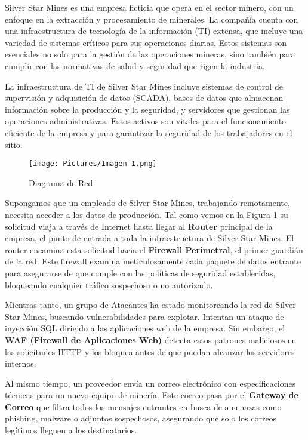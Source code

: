 

Silver Star Mines es una empresa ficticia que opera en el sector minero, con un enfoque en la extracción y procesamiento de minerales. La compañía cuenta con una infraestructura de tecnología de la información (TI) extensa, que incluye una variedad de sistemas críticos para sus operaciones diarias. Estos sistemas son esenciales no solo para la gestión de las operaciones mineras, sino también para cumplir con las normativas de salud y seguridad que rigen la industria.

La infraestructura de TI de Silver Star Mines incluye sistemas de control de supervisión y adquisición de datos (SCADA), bases de datos que almacenan información sobre la producción y la seguridad, y servidores que gestionan las operaciones administrativas. Estos activos son vitales para el funcionamiento eficiente de la empresa y para garantizar la seguridad de los trabajadores en el sitio.

\begin{figure}[h!]
    \centering
    \texttt{[image: Pictures/Imagen 1.png]}
    \caption{Diagrama de Red}
    \label{fig:diagramasilverstarmines}
\end{figure}

Supongamos que un empleado de Silver Star Mines, trabajando remotamente, necesita acceder a los datos de producción. Tal como vemos en la Figura \ref{fig:diagramasilverstarmines} su solicitud viaja a través de Internet hasta llegar al \textbf{Router} principal de la empresa, el punto de entrada a toda la infraestructura de Silver Star Mines.
El router encamina esta solicitud hacia el \textbf{Firewall Perimetral}, el primer guardián de la red. Este firewall examina meticulosamente cada paquete de datos entrante para asegurarse de que cumple con las políticas de seguridad establecidas, bloqueando cualquier tráfico sospechoso o no autorizado.


Mientras tanto, un grupo de Atacantes ha estado monitoreando la red de Silver Star Mines, buscando vulnerabilidades para explotar. Intentan un ataque de inyección SQL dirigido a las aplicaciones web de la empresa. Sin embargo, el\textbf{ WAF (Firewall de Aplicaciones Web)} detecta estos patrones maliciosos en las solicitudes HTTP y los bloquea antes de que puedan alcanzar los servidores internos.

Al mismo tiempo, un proveedor envía un correo electrónico con especificaciones técnicas para un nuevo equipo de minería. Este correo pasa por el \textbf{Gateway de Correo} que filtra todos los mensajes entrantes en busca de amenazas como phishing, malware o adjuntos sospechosos, asegurando que solo los correos legítimos lleguen a los destinatarios.


